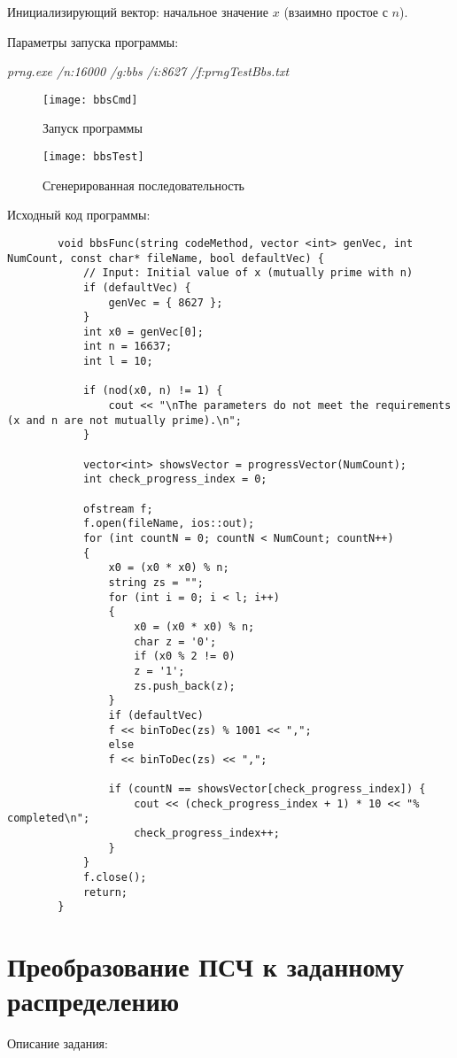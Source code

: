 \documentclass[bachelor, och, coursework]{shiza}
\begin{document}
	Инициализирующий вектор: начальное значение $x$ (взаимно простое с $n$). 
	
	Параметры запуска программы:
	
	\textit{prng.exe /n:16000 /g:bbs /i:8627 /f:prngTestBbs.txt}
	
	\begin{figure}[H]
		\centering
		\texttt{[image: bbsCmd]}
		\caption{Запуск программы}
		\label{fig:bbsCmd}
	\end{figure}
	
	\begin{figure}[H]
		\centering
		\texttt{[image: bbsTest]}
		\caption{Сгенерированная последовательность}
		\label{fig:bbsTest}
	\end{figure}

		Исходный код программы:
	
	\begin{verbatim}
		void bbsFunc(string codeMethod, vector <int> genVec, int NumCount, const char* fileName, bool defaultVec) {
			// Input: Initial value of x (mutually prime with n)
			if (defaultVec) {
				genVec = { 8627 };
			}
			int x0 = genVec[0];
			int n = 16637;
			int l = 10;
			
			if (nod(x0, n) != 1) {
				cout << "\nThe parameters do not meet the requirements (x and n are not mutually prime).\n";
			}
			
			vector<int> showsVector = progressVector(NumCount);
			int check_progress_index = 0;
			
			ofstream f;
			f.open(fileName, ios::out);
			for (int countN = 0; countN < NumCount; countN++)
			{
				x0 = (x0 * x0) % n;
				string zs = "";
				for (int i = 0; i < l; i++)
				{
					x0 = (x0 * x0) % n;
					char z = '0';
					if (x0 % 2 != 0)
					z = '1';
					zs.push_back(z);
				}
				if (defaultVec)
				f << binToDec(zs) % 1001 << ",";
				else
				f << binToDec(zs) << ",";
				
				if (countN == showsVector[check_progress_index]) {
					cout << (check_progress_index + 1) * 10 << "% completed\n";
					check_progress_index++;
				}
			}
			f.close();
			return;
		}
	\end{verbatim}

	\section{Преобразование ПСЧ к заданному распределению}

	Описание задания:
\end{document}
